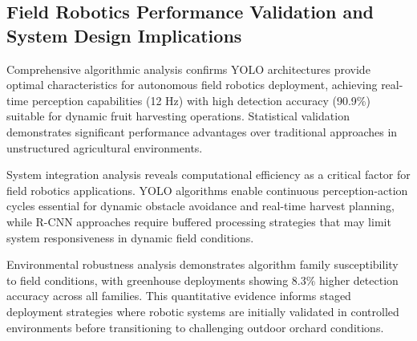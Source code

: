 \documentclass[a4paper,fleqn]{cas-dc}
\begin{document}
\subsection{Field Robotics Performance Validation and System Design Implications}
Comprehensive algorithmic analysis confirms YOLO architectures provide optimal characteristics for autonomous field robotics deployment, achieving real-time perception capabilities (12 Hz) with high detection accuracy (90.9\%) suitable for dynamic fruit harvesting operations. Statistical validation demonstrates significant performance advantages over traditional approaches in unstructured agricultural environments.

System integration analysis reveals computational efficiency as a critical factor for field robotics applications. YOLO algorithms enable continuous perception-action cycles essential for dynamic obstacle avoidance and real-time harvest planning, while R-CNN approaches require buffered processing strategies that may limit system responsiveness in dynamic field conditions.

Environmental robustness analysis demonstrates algorithm family susceptibility to field conditions, with greenhouse deployments showing 8.3\% higher detection accuracy across all families. This quantitative evidence informs staged deployment strategies where robotic systems are initially validated in controlled environments before transitioning to challenging outdoor orchard conditions.
\end{document}
